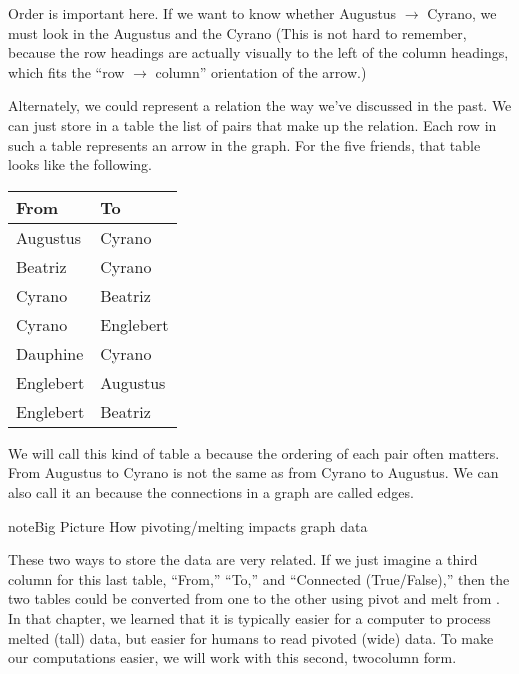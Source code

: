 \documentclass[letterpaper,10pt,english]{sphinxmanual}
\begin{document}
Order is important here.  If we want to know whether Augustus \(\to\) Cyrano, we must look in the Augustus  and the Cyrano   (This is not hard to remember, because the row headings are actually visually to the left of the column headings, which fits the “row \(\to\) column” orientation of the arrow.)

Alternately, we could represent a relation the way we’ve discussed in the past.  We can just store in a table the list of pairs that make up the relation.  Each row in such a table represents an arrow in the graph.  For the five friends, that table looks like the following.


\begin{savenotes}\sphinxattablestart
\centering
\begin{tabulary}{\linewidth}[t]{|T|T|}
\hline
\sphinxstyletheadfamily 
From
&\sphinxstyletheadfamily 
To
\\
\hline
Augustus
&
Cyrano
\\
\hline
Beatriz
&
Cyrano
\\
\hline
Cyrano
&
Beatriz
\\
\hline
Cyrano
&
Englebert
\\
\hline
Dauphine
&
Cyrano
\\
\hline
Englebert
&
Augustus
\\
\hline
Englebert
&
Beatriz
\\
\hline
\end{tabulary}
\par
\sphinxattableend\end{savenotes}

We will call this kind of table a  because the ordering of each pair often matters.  From Augustus to Cyrano is not the same as from Cyrano to Augustus.  We can also call it an  because the connections in a graph are called edges.

\begin{sphinxadmonition}{note}{Big Picture \sphinxhyphen{} How pivoting/melting impacts graph data}

These two ways to store the data are very related.  If we just imagine a third column for this last table, “From,” “To,” and “Connected (True/False),” then the two tables could be converted from one to the other using pivot and melt from {\hyperref[\detokenize{chapter-6-single-table-verbs::doc}]{}}.  In that chapter, we learned that it is typically easier for a computer to process melted (tall) data, but easier for humans to read pivoted (wide) data.  To make our computations easier, we will work with this second, two\sphinxhyphen{}column form.
\end{sphinxadmonition}
\end{document}
